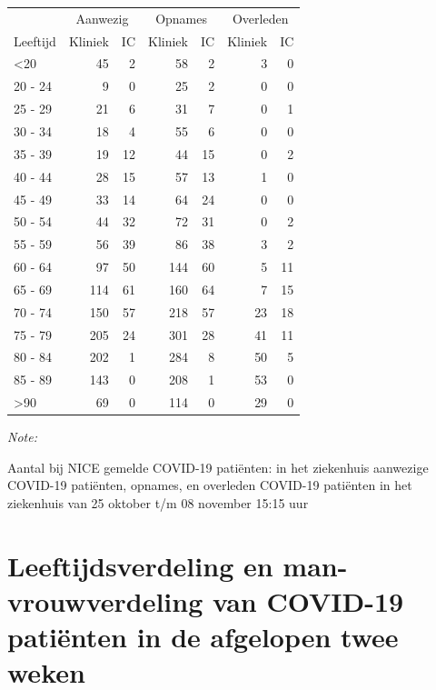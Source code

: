 \documentclass[
  english,
  man,floatsintext]{apa6}
\begin{document}
\begin{table}
\centering\begingroup\fontsize{10}{12}\selectfont

\begin{threeparttable}
\begin{tabular}{lrrrrrr}
\toprule
\multicolumn{1}{c}{ } & \multicolumn{2}{c}{Aanwezig} & \multicolumn{2}{c}{Opnames} & \multicolumn{2}{c}{Overleden} \\
\cmidrule(l{3pt}r{3pt}){2-3} \cmidrule(l{3pt}r{3pt}){4-5} \cmidrule(l{3pt}r{3pt}){6-7}
Leeftijd & Kliniek & IC & Kliniek & IC & Kliniek & IC\\
\midrule
<20 & 45 & 2 & 58 & 2 & 3 & 0\\
20 - 24 & 9 & 0 & 25 & 2 & 0 & 0\\
25 - 29 & 21 & 6 & 31 & 7 & 0 & 1\\
30 - 34 & 18 & 4 & 55 & 6 & 0 & 0\\
35 - 39 & 19 & 12 & 44 & 15 & 0 & 2\\
40 - 44 & 28 & 15 & 57 & 13 & 1 & 0\\
45 - 49 & 33 & 14 & 64 & 24 & 0 & 0\\
50 - 54 & 44 & 32 & 72 & 31 & 0 & 2\\
55 - 59 & 56 & 39 & 86 & 38 & 3 & 2\\
60 - 64 & 97 & 50 & 144 & 60 & 5 & 11\\
65 - 69 & 114 & 61 & 160 & 64 & 7 & 15\\
70 - 74 & 150 & 57 & 218 & 57 & 23 & 18\\
75 - 79 & 205 & 24 & 301 & 28 & 41 & 11\\
80 - 84 & 202 & 1 & 284 & 8 & 50 & 5\\
85 - 89 & 143 & 0 & 208 & 1 & 53 & 0\\
>90 & 69 & 0 & 114 & 0 & 29 & 0\\
\bottomrule
\end{tabular}
\begin{tablenotes}
\item \textit{Note: } 
\item Aantal bij NICE gemelde COVID-19 patiënten: in het ziekenhuis aanwezige COVID-19 patiënten, opnames, en overleden COVID-19 patiënten in het ziekenhuis van 25 oktober t/m 08 november 15:15 uur
\end{tablenotes}
\end{threeparttable}
\endgroup{}
\end{table}

\newpage

\hypertarget{leeftijdsverdeling-en-man-vrouwverdeling-van-covid-19-patiuxebnten-in-de-afgelopen-twee-weken}{%
\section{Leeftijdsverdeling en man-vrouwverdeling van COVID-19 patiënten in de afgelopen twee weken}\label{leeftijdsverdeling-en-man-vrouwverdeling-van-covid-19-patiuxebnten-in-de-afgelopen-twee-weken}}
\end{document}
